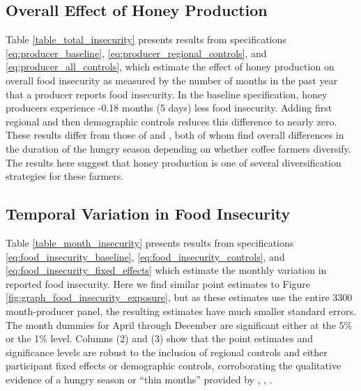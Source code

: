 \documentclass[../main.tex]{subfiles}
\begin{document}
\subsection{Overall Effect of Honey Production}
Table \ref{table_total_insecurity} presents results from specifications 
\ref{eq:producer_baseline}, \ref{eq:producer_regional_controls}, and \ref{eq:producer_all_controls},
which estimate the effect of honey production on overall food insecurity as measured by the number of months in the past year that a producer reports food insecurity. In the baseline
specification, honey producers experience -0.18 months (5 days) less food insecurity. Adding first regional and then demographic controls reduces this difference to nearly zero.
These results differ from those of \textcite{baconExplainingHungryFarmer2014} and
\textcite{anderzenEffectsOnfarmDiversification2020},
both of whom find overall differences in the duration of the hungry season depending on whether coffee farmers diversify. The results here
suggest that honey production is one of several diversification
strategies for these farmers.

\subsection{Temporal Variation in Food Insecurity}
Table \ref{table_month_insecurity} presents results from specifications
\ref{eq:food_insecurity_baseline}, \ref{eq:food_insecurity_controls},
and \ref{eq:food_insecurity_fixed_effects} which estimate the monthly variation in reported food insecurity. Here we find similar point estimates to Figure \ref{fig:graph_food_insecurity_exposure}, but as  these estimates use the entire 3300 month-producer panel, the resulting estimates have much smaller standard errors. The month dummies for April through December are significant either at the 5\% or the 1\% level.
Columns (2) and (3) show that the point estimates and significance levels are robust to the inclusion of regional controls and either participant fixed effects or demographic controls, corroborating the qualitative evidence of a hungry season or ``thin months'' provided by \textcite{morrisMesesFlacosSeasonal2013}, 
\textcite{gerliczUsePerceptionsAlternative2019}, \textcite{anderzenEffectsOnfarmDiversification2020}. 
\end{document}
